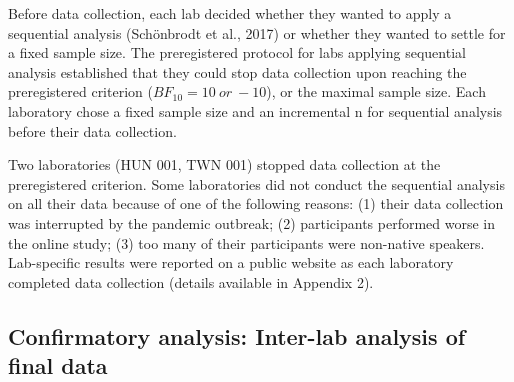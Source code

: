 \documentclass[
  man,floatsintext]{apa6}
\begin{document}
Before data collection, each lab decided whether they wanted to apply a sequential analysis (Schönbrodt et al., 2017) or whether they wanted to settle for a fixed sample size. The preregistered protocol for labs applying sequential analysis established that they could stop data collection upon reaching the preregistered criterion (\(BF_{10} = 10\ or\ -10\)), or the maximal sample size. Each laboratory chose a fixed sample size and an incremental n for sequential analysis before their data collection.

Two laboratories (HUN 001, TWN 001) stopped data collection at the preregistered criterion. Some laboratories did not conduct the sequential analysis on all their data because of one of the following reasons: (1) their data collection was interrupted by the pandemic outbreak; (2) participants performed worse in the online study; (3) too many of their participants were non-native speakers. Lab-specific results were reported on a public website as each laboratory completed data collection (details available in Appendix 2).

\hypertarget{confirmatory-analysis-inter-lab-analysis-of-final-data}{%
\subsection{Confirmatory analysis: Inter-lab analysis of final data}\label{confirmatory-analysis-inter-lab-analysis-of-final-data}}
\end{document}
